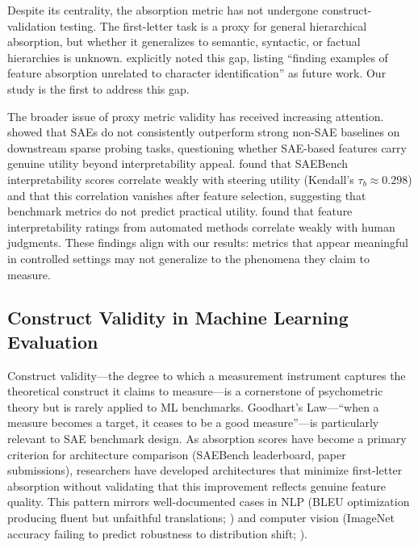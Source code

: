 \documentclass{article}
\begin{document}
Despite its centrality, the absorption metric has not undergone construct-validation testing. The first-letter task is a proxy for general hierarchical absorption, but whether it generalizes to semantic, syntactic, or factual hierarchies is unknown. \citet{chanin2024feature} explicitly noted this gap, listing ``finding examples of feature absorption unrelated to character identification'' as future work. Our study is the first to address this gap.

The broader issue of proxy metric validity has received increasing attention. \citet{kantamneni2025saebaseline} showed that SAEs do not consistently outperform strong non-SAE baselines on downstream sparse probing tasks, questioning whether SAE-based features carry genuine utility beyond interpretability appeal. \citet{wang2025saeinterp} found that SAEBench interpretability scores correlate weakly with steering utility (Kendall's $\tau_b \approx 0.298$) and that this correlation vanishes after feature selection, suggesting that benchmark metrics do not predict practical utility. \citet{lieberum2024automated} found that feature interpretability ratings from automated methods correlate weakly with human judgments. These findings align with our results: metrics that appear meaningful in controlled settings may not generalize to the phenomena they claim to measure.

\subsection{Construct Validity in Machine Learning Evaluation}

Construct validity---the degree to which a measurement instrument captures the theoretical construct it claims to measure---is a cornerstone of psychometric theory \citep{cronbach1955construct} but is rarely applied to ML benchmarks. Goodhart's Law---``when a measure becomes a target, it ceases to be a good measure''---is particularly relevant to SAE benchmark design. As absorption scores have become a primary criterion for architecture comparison (SAEBench leaderboard, paper submissions), researchers have developed architectures that minimize first-letter absorption without validating that this improvement reflects genuine feature quality. This pattern mirrors well-documented cases in NLP (BLEU optimization producing fluent but unfaithful translations; \citealt{novikova2017why}) and computer vision (ImageNet accuracy failing to predict robustness to distribution shift; \citealt{geirhos2020shortcut}).
\end{document}
